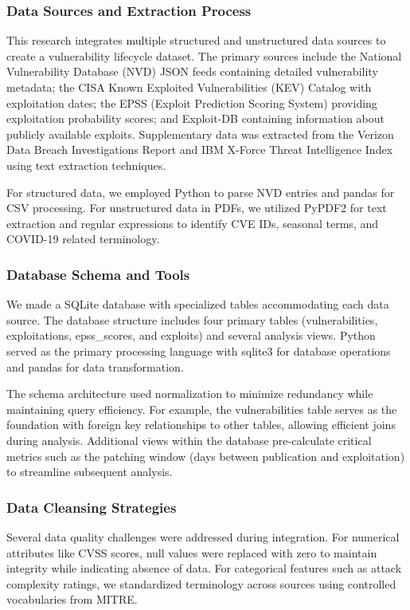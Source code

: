 \documentclass[runningheads]{llncs}
\begin{document}
\subsubsection{Data Sources and Extraction Process}
This research integrates multiple structured and unstructured data sources to create a vulnerability lifecycle dataset. The primary sources include the National Vulnerability Database (NVD) JSON feeds containing detailed vulnerability metadata; the CISA Known Exploited Vulnerabilities (KEV) Catalog with exploitation dates; the EPSS (Exploit Prediction Scoring System) providing exploitation probability scores; and Exploit-DB containing information about publicly available exploits. Supplementary data was extracted from the Verizon Data Breach Investigations Report and IBM X-Force Threat Intelligence Index using text extraction techniques.

For structured data, we employed Python to parse NVD entries and pandas for CSV processing. For unstructured data in PDFs, we utilized PyPDF2 for text extraction and regular expressions to identify CVE IDs, seasonal terms, and COVID-19 related terminology. 

\subsubsection{Database Schema and Tools}
We made a SQLite database with specialized tables accommodating each data source. The database structure includes four primary tables (vulnerabilities, exploitations, epss\_scores, and exploits) and several analysis views. Python served as the primary processing language with sqlite3 for database operations and pandas for data transformation.

The schema architecture used normalization to minimize redundancy while maintaining query efficiency. For example, the vulnerabilities table serves as the foundation with foreign key relationships to other tables, allowing efficient joins during analysis. Additional views within the database pre-calculate critical metrics such as the patching window (days between publication and exploitation) to streamline subsequent analysis.

\subsubsection{Data Cleansing Strategies}
Several data quality challenges were addressed during integration. For numerical attributes like CVSS scores, null values were replaced with zero to maintain integrity while indicating absence of data. For categorical features such as attack complexity ratings, we standardized terminology across sources using controlled vocabularies from MITRE.
\end{document}
